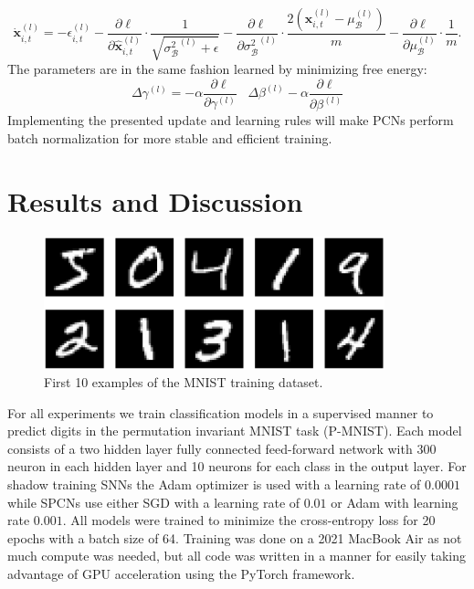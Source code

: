 \documentclass[a4paper,11pt]{article} %
\begin{document}
\begin{equation}
  \dot{\mathbf{x}}_{i,t}^{(l)} = -\epsilon_{i, t}^{(l)} - 
    \frac{\partial \ell}{\partial \widehat{\mathbf{x}}_{i,t}^{(l)}} \cdot \frac{1}{\sqrt{ {\sigma_{\mathcal{B}}^{2}}^{(l)} + \epsilon }} - \frac{\partial \ell}{\partial {\sigma_{\mathcal{B}}^{2}}^{(l)}} \cdot \frac{2\left(\mathbf{x}_{i,t}^{(l)}-\mu_{\mathcal{B}}^{(l)} \right)}{m}- \frac{\partial \ell}{\partial \mu_{\mathcal{B}}^{(l)}} \cdot \frac{1}{m}.
\end{equation}
The parameters are in the same fashion learned by minimizing free energy:
\begin{equation}
  \Delta \gamma^{(l)} = -\alpha \frac{\partial \ell}{\partial \gamma^{(l)}} \hspace{10pt} \Delta \beta^{(l)} -\alpha \frac{\partial \ell}{\partial \beta^{(l)}}
\end{equation}
Implementing the presented update and learning rules will make PCNs perform batch normalization for more stable and efficient training.

\newpage

\section{Results and Discussion}
\begin{figure}[ht]
  \centering
  \includegraphics[width=280pt]{graphics/mnist.png}  
  \caption{First 10 examples of the MNIST training dataset.}
  \label{fig:MNIST}
\end{figure}
For all experiments we train classification models in a supervised manner to predict digits in the permutation invariant MNIST task (P-MNIST). Each model consists of a two hidden layer fully connected feed-forward network with 300 neuron in each hidden layer and 10 neurons for each class in the output layer. For shadow training SNNs the Adam optimizer is used with a learning rate of $0.0001$ while SPCNs use either SGD with a learning rate of $0.01$ or Adam with learning rate $0.001$. All models were trained to minimize the cross-entropy loss for 20 epochs with a batch size of 64. Training was done on a 2021 MacBook Air as not much compute was needed, but all code was written in a manner for easily taking advantage of GPU acceleration using the PyTorch framework. 
\end{document}
